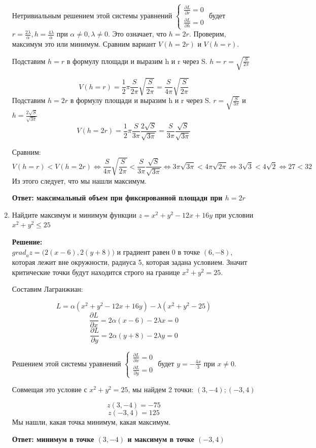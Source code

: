 \documentclass[a4paper,12pt]{article}
\renewcommand{\leq}{\leqslant}
\newcounter{z}
\begin{document}
\begin{enumerate}
Нетривиальным решением этой системы уравнений $\begin{cases} \frac{\partial L}{\partial r}=0 \\ \frac{\partial L}{\partial h}=0\end{cases}$ будет $r=\frac{2\lambda}{\alpha}, h=\frac{4\lambda}{\alpha}$ при $\alpha\neq0, \lambda\neq0$. Это означает, что $h=2r$. Проверим, максимум это или минимум.
Сравним вариант $V(h=2r)$ и $V(h=r)$.

Подставим $h=r$ в формулу площади и выразим h и r через S. $h =r= \sqrt{\frac{S}{2\pi}}$ 

$$V(h=r)=\frac{1}{2}\pi \frac{S}{2\pi} \sqrt{\frac{S}{2\pi}}=\frac{S}{4\pi} \sqrt{\frac{S}{2\pi}}$$
Подставим $h=2r$ в формулу площади и выразим h и r через S. $ r= \sqrt{\frac{S}{3\pi}}$  и $ h= \frac{2\sqrt{S}}{\sqrt{3\pi}}$
$$V(h=2r)=\frac{1}{2}\pi \frac{S}{3\pi} \frac{2\sqrt{S}}{\sqrt{3\pi}}=\frac{S}{3\pi} \frac{\sqrt{S}}{\sqrt{3\pi}}$$

Сравним:
$$V(h=r) < V(h=2r) \Leftrightarrow \frac{S}{4\pi} \sqrt{\frac{S}{2\pi}}<\frac{S}{3\pi} \frac{\sqrt{S}}{\sqrt{3\pi}}\Leftrightarrow 3\pi \sqrt{3\pi} <4\pi \sqrt{2\pi}\Leftrightarrow3 \sqrt{3} <4 \sqrt{2} \Leftrightarrow 27<32$$ 
Из этого следует, что мы нашли максимум.


\textbf{Ответ: максимальный объем при фиксированной площади при  $h=2r$}

\item Найдите максимум и минимум функции  $z = x^2 + y^2 -12x +16y$ при условии $x^2 + y^2 \leq 25$

\textbf{Решение:}\\

${grad}_az = \big(2(x-6), 2(y+8)\big)$ и градиент равен 0 в точке $(6,-8)$, которая лежит вне окружности, радиуса 5, которая задана условием. Значит критические точки будут находится строго на границе $x^2 + y^2 = 25$.

Составим Лагранжиан:

$$L= \alpha(x^2 + y^2 -12x +16y)-\lambda(x^2 + y^2 -25)$$
$$\frac{\partial L}{\partial x} = 2\alpha(x-6)-2\lambda x =0$$
$$\frac{\partial L}{\partial y} = 2\alpha(y+8)-2\lambda y =0$$

Решением этой системы уравнений $\begin{cases} \frac{\partial L}{\partial x}=0 \\ \frac{\partial L}{\partial y}=0\end{cases}$ будет $y =-\frac{4x}{3}$ при $x\neq0$.

Совмещая это условие с $x^2 + y^2 = 25$, мы найдем 2 точки:
$(3,-4);(-3,4)$

$$z(3,-4)=-75$$
$$z(-3,4)=125$$
Мы нашли, какая точка минимум, какая максимум.

\textbf{Ответ: минимум в точке $(3,-4)$ и максимум в точке $(-3,4)$}

\end{enumerate}
\end{document}
